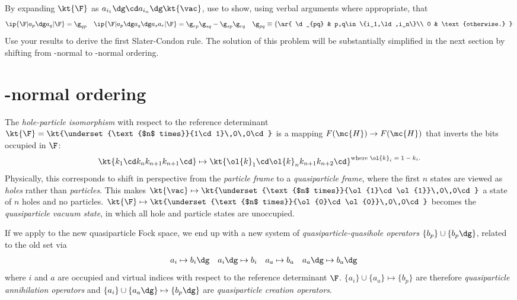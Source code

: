\documentclass[11pt,fleqn]{article}
\numberwithin{equation}{section}
\begin{document}
\begin{prob}\label{slater-rule-1}
By expanding $\kt{\F}$ as $a_{i_1}\dg\cd a_{i_n}\dg\kt{\vac}$, use  to show, using verbal arguments where appropriate, that
\begin{align*}
  \ip{\F|a_p\dg a_q|\F}
=
  \g_{qp}
&&
  \ip{\F|a_p\dg a_q\dg a_sa_r|\F}
=
  \g_{rp}\g_{sq}
-
  \g_{sp}\g_{rq}
&&
  \g_{pq}
\equiv
  \left\{\ar{
    \d_{pq} & p,q\in\{i_1,\ld,i_n\}\\
    0       & \text{otherwise.}
  }\right.
\end{align*}
Use your results to derive the first Slater-Condon rule.
The solution of this problem will be substantially simplified in the next section by shifting from \vac-normal to \F-normal ordering.
\end{prob}


\section{\F-normal ordering}

\begin{dfn} \label{hole-particle-isomorphism}
The \textit{hole-particle isomorphism} with respect to the reference determinant $\kt{\F}=\kt{\underset{\text{$n$ times}}{1\cd1}\,0\,0\cd}$ is a mapping $F(\mc{H})\rightarrow F(\mc{H})$ that inverts the bits occupied in $\F$:
\begin{align*}
  \kt{k_1\cd k_nk_{n+1}k_{n+1}\cd}
\mapsto
  \kt{\ol{k}_1\cd \ol{k}_nk_{n+1}k_{n+2}\cd}
\sp
  \text{where $\ol{k}_i=1-k_i$.}
\end{align*}
Physically, this corresponds to shift in perspective from the \textit{particle frame} to a \textit{quasiparticle frame}, where the first $n$ states are viewed as \textit{holes} rather than \textit{particles}.
This makes $\kt{\vac}\mapsto\kt{\underset{\text{$n$ times}}{\ol{1}\cd\ol{1}}\,0\,0\cd}$ a state of $n$ holes and no particles.  $\kt{\F}\mapsto\kt{\underset{\text{$n$ times}}{\ol{0}\cd\ol{0}}\,0\,0\cd}$ becomes the \textit{quasiparticle vacuum state}, in which all hole and particle states are unoccupied.
\end{dfn}

\begin{dfn}
If we apply  to the new quasiparticle Fock space, we end up with a new system of \textit{quasiparticle-quasihole operators} $\{b_p\}\cup\{b_p\dg\}$, related to the old set via
\begin{align}
&&
  a_i
\mapsto
  b_i\dg
&&
  a_i\dg
\mapsto
  b_i
&&
  a_a
\mapsto
  b_a
&&
  a_a\dg
\mapsto
  b_a\dg
\end{align}
where $i$ and $a$ are occupied and virtual indices with respect to the reference determinant $\F$.
$\{a_i\}\cup\{a_a\}\mapsto\{b_p\}$ are therefore \textit{quasiparticle annihilation operators} and $\{a_i\}\cup\{a_a\dg\}\mapsto\{b_p\dg\}$ are \textit{quasiparticle creation operators}.
\end{dfn}
\end{document}
